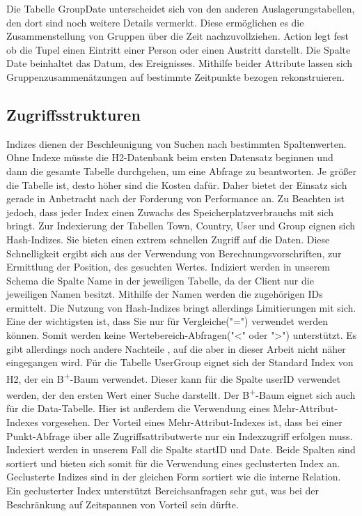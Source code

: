 Die Tabelle GroupDate unterscheidet sich von den anderen Auslagerungstabellen, den dort sind noch weitere Details vermerkt. Diese ermöglichen es die Zusammenstellung von Gruppen über die Zeit nachzuvollziehen. Action legt fest ob die Tupel einen Eintritt einer Person oder einen Austritt darstellt. Die Spalte Date beinhaltet das Datum, des Ereignisses. Mithilfe beider Attribute lassen sich Gruppenzusammenätzungen auf bestimmte Zeitpunkte bezogen rekonstruieren.

\subsection{Zugriffsstrukturen}

Indizes dienen der Beschleunigung von Suchen nach bestimmten Spaltenwerten. Ohne Indexe müsste die H2-Datenbank beim ersten Datensatz beginnen und dann die gesamte Tabelle durchgehen, um eine Abfrage zu beantworten. Je größer die Tabelle ist, desto höher sind die Kosten dafür. Daher bietet der Einsatz sich gerade in Anbetracht nach der Forderung von Performance an. Zu Beachten ist jedoch, dass jeder Index einen Zuwachs des Speicherplatzverbrauchs mit sich bringt. Zur Indexierung der Tabellen Town, Country, User und Group eignen sich Hash-Indizes. Sie bieten einen extrem schnellen Zugriff auf die Daten. Diese Schnelligkeit ergibt sich aus der Verwendung von Berechnungsvorschriften, zur Ermittlung der Position, des gesuchten Wertes. Indiziert werden in unserem Schema die Spalte Name in der jeweiligen Tabelle, da der Client nur die jeweiligen Namen besitzt. Mithilfe der Namen werden die zugehörigen IDs ermittelt. Die Nutzung von Hash-Indizes bringt allerdings Limitierungen mit sich. Eine der wichtigsten ist, dass Sie nur für Vergleiche("=") verwendet werden können. Somit werden keine Wertebereich-Abfragen("<" oder ">") unterstützt. Es gibt allerdings noch andere Nachteile \cite{SWB-352401869}, auf die aber in dieser Arbeit nicht näher eingegangen wird. 
Für die Tabelle UserGroup eignet sich der Standard Index von H2, der ein B\textsuperscript{+}-Baum verwendet. Dieser kann für die Spalte userID verwendet werden, der den ersten Wert einer Suche darstellt. Der B\textsuperscript{+}-Baum eignet sich auch für die Data-Tabelle. Hier ist außerdem die Verwendung eines Mehr-Attribut-Indexes vorgesehen. Der Vorteil eines Mehr-Attribut-Indexes ist, dass bei einer Punkt-Abfrage über alle Zugriffsattributwerte nur ein Indexzugriff erfolgen muss. Indexiert werden in unserem Fall die Spalte startID und Date. Beide Spalten sind sortiert und bieten sich somit für die Verwendung eines geclusterten Index an. Geclusterte Indizes sind in der gleichen Form sortiert wie die interne Relation. Ein geclusterter Index unterstützt Bereichsanfragen sehr gut, was bei der Beschränkung auf Zeitspannen von Vorteil sein dürfte.       


